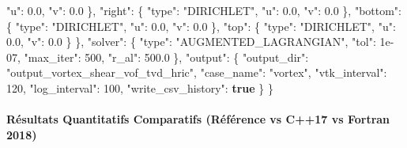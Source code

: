 \documentclass[
  10pt,
]{article}
\newenvironment{Shaded}{}{}
\newcommand{\DataTypeTok}[1]{\textcolor[rgb]{0.56,0.13,0.00}{#1}}
\newcommand{\DecValTok}[1]{\textcolor[rgb]{0.25,0.63,0.44}{#1}}
\newcommand{\FloatTok}[1]{\textcolor[rgb]{0.25,0.63,0.44}{#1}}
\newcommand{\FunctionTok}[1]{\textcolor[rgb]{0.02,0.16,0.49}{#1}}
\newcommand{\KeywordTok}[1]{\textcolor[rgb]{0.00,0.44,0.13}{\textbf{#1}}}
\newcommand{\StringTok}[1]{\textcolor[rgb]{0.25,0.44,0.63}{#1}}
\begin{document}
\begin{Shaded}
\begin{Highlighting}[]
      \DataTypeTok{"u"}\FunctionTok{:} \FloatTok{0.0}\FunctionTok{,}
      \DataTypeTok{"v"}\FunctionTok{:} \FloatTok{0.0}
    \FunctionTok{\},}
    \DataTypeTok{"right"}\FunctionTok{:} \FunctionTok{\{}
      \DataTypeTok{"type"}\FunctionTok{:} \StringTok{"DIRICHLET"}\FunctionTok{,}
      \DataTypeTok{"u"}\FunctionTok{:} \FloatTok{0.0}\FunctionTok{,}
      \DataTypeTok{"v"}\FunctionTok{:} \FloatTok{0.0}
    \FunctionTok{\},}
    \DataTypeTok{"bottom"}\FunctionTok{:} \FunctionTok{\{}
      \DataTypeTok{"type"}\FunctionTok{:} \StringTok{"DIRICHLET"}\FunctionTok{,}
      \DataTypeTok{"u"}\FunctionTok{:} \FloatTok{0.0}\FunctionTok{,}
      \DataTypeTok{"v"}\FunctionTok{:} \FloatTok{0.0}
    \FunctionTok{\},}
    \DataTypeTok{"top"}\FunctionTok{:} \FunctionTok{\{}
      \DataTypeTok{"type"}\FunctionTok{:} \StringTok{"DIRICHLET"}\FunctionTok{,}
      \DataTypeTok{"u"}\FunctionTok{:} \FloatTok{0.0}\FunctionTok{,}
      \DataTypeTok{"v"}\FunctionTok{:} \FloatTok{0.0}
    \FunctionTok{\}}
  \FunctionTok{\},}
  \DataTypeTok{"solver"}\FunctionTok{:} \FunctionTok{\{}
    \DataTypeTok{"type"}\FunctionTok{:} \StringTok{"AUGMENTED\_LAGRANGIAN"}\FunctionTok{,}
    \DataTypeTok{"tol"}\FunctionTok{:} \DecValTok{1e{-}07}\FunctionTok{,}
    \DataTypeTok{"max\_iter"}\FunctionTok{:} \DecValTok{500}\FunctionTok{,}
    \DataTypeTok{"r\_al"}\FunctionTok{:} \FloatTok{500.0}
  \FunctionTok{\},}
  \DataTypeTok{"output"}\FunctionTok{:} \FunctionTok{\{}
    \DataTypeTok{"output\_dir"}\FunctionTok{:} \StringTok{"output\_vortex\_shear\_vof\_tvd\_hric"}\FunctionTok{,}
    \DataTypeTok{"case\_name"}\FunctionTok{:} \StringTok{"vortex"}\FunctionTok{,}
    \DataTypeTok{"vtk\_interval"}\FunctionTok{:} \DecValTok{120}\FunctionTok{,}
    \DataTypeTok{"log\_interval"}\FunctionTok{:} \DecValTok{100}\FunctionTok{,}
    \DataTypeTok{"write\_csv\_history"}\FunctionTok{:} \KeywordTok{true}
  \FunctionTok{\}}
\FunctionTok{\}}
\end{Highlighting}
\end{Shaded}

\paragraph{Résultats Quantitatifs Comparatifs (Référence vs C++17 vs
Fortran
2018)}\label{ruxe9sultats-quantitatifs-comparatifs-ruxe9fuxe9rence-vs-c17-vs-fortran-2018-4}
\end{document}
